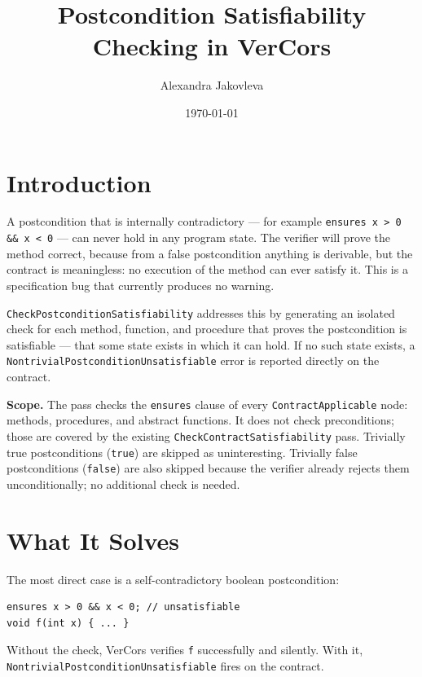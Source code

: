 \documentclass[9pt,a4paper,twocolumn]{article}
\title{\textbf{Postcondition Satisfiability Checking in VerCors}}
\author{Alexandra Jakovleva}
\date{\today}
\begin{document}
\maketitle

\section{Introduction}

A postcondition that is internally contradictory — for example
\texttt{ensures x > 0 \&\& x < 0} — can never hold in any
program state. The verifier will prove the method correct, because
from a false postcondition anything is derivable, but the contract
is meaningless: no execution of the method can ever satisfy it.
This is a specification bug that currently produces no warning.

\texttt{CheckPostconditionSatisfiability} addresses this by
generating an isolated check for each method, function, and
procedure that proves the postcondition is satisfiable — that
some state exists in which it can hold. If no such state exists,
a \texttt{NontrivialPostconditionUnsatisfiable} error is reported
directly on the contract.

\textbf{Scope.} The pass checks the \texttt{ensures} clause of
every \texttt{ContractApplicable} node: methods, procedures, and
abstract functions. It does not check preconditions; those are
covered by the existing \texttt{CheckContractSatisfiability} pass.
Trivially true postconditions (\texttt{true}) are skipped as
uninteresting. Trivially false postconditions (\texttt{false})
are also skipped because the verifier already rejects them
unconditionally; no additional check is needed.

\section{What It Solves}

The most direct case is a self-contradictory boolean postcondition:

\begin{lstlisting}
ensures x > 0 && x < 0; // unsatisfiable
void f(int x) { ... }
\end{lstlisting}

Without the check, VerCors verifies \texttt{f} successfully and
silently. With it, \texttt{NontrivialPostconditionUnsatisfiable}
fires on the contract.
\end{document}
